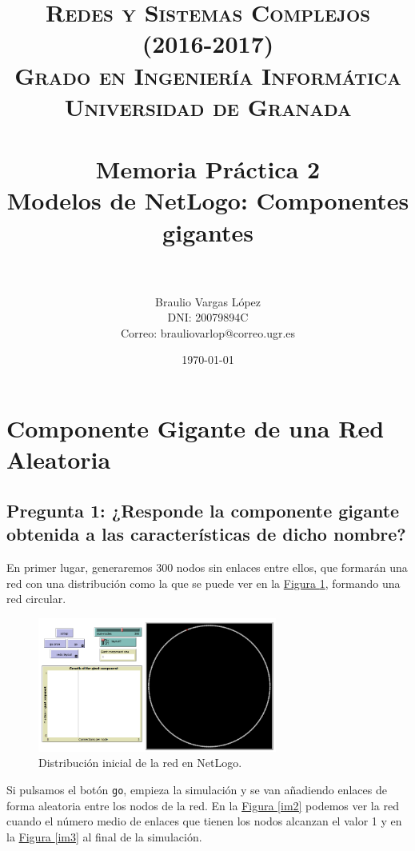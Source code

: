 \documentclass[paper=a4, fontsize=11pt]{article} %
\title{
\normalfont \normalsize
\textsc{{\bf Redes y Sistemas Complejos (2016-2017)} \\ Grado en Ingeniería Informática \\ Universidad de Granada} \\ [25pt] %
\horrule{0.5pt} \\[0.4cm] %
\huge Memoria Práctica 2\\ Modelos de NetLogo: Componentes gigantes\\%
\horrule{2pt} \\[0.5cm] %
}
\author{Braulio Vargas López\\DNI: 20079894C\\Correo: brauliovarlop@correo.ugr.es} %
\date{\normalsize\today} %
\numberwithin{equation}{section} %
\numberwithin{figure}{section} %
\numberwithin{table}{section} %
\begin{document}
\maketitle %
\newpage %

\tableofcontents %


\section{Componente Gigante de una Red Aleatoria}

\subsection{Pregunta 1: ¿Responde la componente gigante obtenida a las características de dicho nombre?}

En primer lugar, generaremos 300 nodos sin enlaces entre ellos, que formarán una red con una distribución como la que se puede ver en la \hyperref[im1]{Figura \ref{im1}}, formando una red circular.

\begin{figure}[H]
  \centering
  \includegraphics[width=0.7\textwidth]{img/im1}
  \caption{Distribución inicial de la red en NetLogo.}
  \label{im1}
\end{figure}

Si pulsamos el botón \texttt{go}, empieza la simulación y se van añadiendo enlaces de forma aleatoria entre los nodos de la red. En la \hyperref[im2]{Figura \ref{im2}} podemos ver la red cuando el número medio de enlaces que tienen los nodos alcanzan el valor 1 y en la \hyperref[im3]{Figura \ref{im3}} al final de la simulación.
\end{document}
